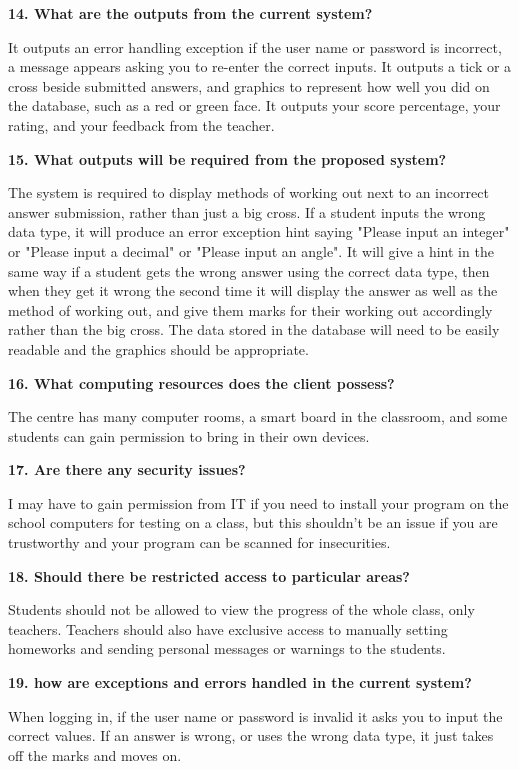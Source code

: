\textbf{14. What are the outputs from the current system?}

It outputs an error handling exception if the user name or password is incorrect, a message appears asking you to re-enter the correct inputs. It outputs a tick or a cross beside submitted answers, and graphics to represent how well you did on the database, such as a red or green face. It outputs your score percentage, your rating, and your feedback from the teacher. 

\textbf{15. What outputs will be required from the proposed system?}

The system is required to display methods of working out next to an incorrect answer submission, rather than just a big cross. If a student inputs the wrong data type, it will produce an error exception hint saying "Please input an integer" or "Please input a decimal" or "Please input an angle". It will give a hint in the same way if a student gets the wrong answer using the correct data type, then when they get it wrong the second time it will display the answer as well as the method of working out, and give them marks for their working out accordingly rather than the big cross. The data stored in the database will need to be easily readable and the graphics should be appropriate.

\textbf{16. What computing resources does the client possess?}

The centre has many computer rooms, a smart board in the classroom, and some students can gain permission to bring in their own devices.

\textbf{17. Are there any security issues?}

I may have to gain permission from IT if you need to install your program on the school computers for testing on a class, but this shouldn't be an issue if you are trustworthy and your program can be scanned for insecurities.

\textbf{18. Should there be restricted access to particular areas?}

Students should not be allowed to view the progress of the whole class, only teachers. Teachers should also have exclusive access to manually setting homeworks and sending personal messages or warnings to the students. 

\textbf{19. how are exceptions and errors handled in the current system?}

When logging in, if the user name or password is invalid it asks you to input the correct values. If an answer is wrong, or uses the wrong data type, it just takes off the marks and moves on.


